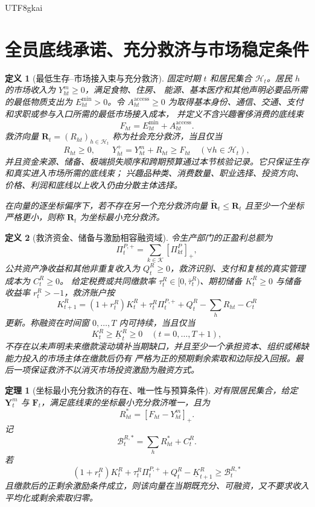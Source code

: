 \documentclass[12pt,a4paper,openany]{report}
\newtheorem{definition}{定义}[chapter]
\newtheorem{theorem}{定理}[chapter]
\begin{document}
\begin{CJK*}{UTF8}{gkai}
\section{全员底线承诺、充分救济与市场稳定条件}
\label{sec:sufficient-relief-floor}

\begin{definition}[最低生存--市场接入束与充分救济]
固定时期 \(t\) 和居民集合 \(\mathcal H_t\)。居民 \(h\) 的市场收入为 \(Y_{ht}^{m}\ge0\)，满足食物、住房、
能源、基本医疗和其他声明必要品所需的最低物质支出为 \(E_{ht}^{\min}>0\)。令
\(A_{ht}^{\mathrm{access}}\ge0\) 为取得基本身份、通信、交通、支付和求职或参与入口所需的最低市场接入成本，
并定义不含兴趣奢侈消费的底线束
\[
  F_{ht}
  =E_{ht}^{\min}+A_{ht}^{\mathrm{access}}.
\]
救济向量 \(\mathbf R_t=(R_{ht})_{h\in\mathcal H_t}\) 称为社会充分救济，当且仅当
\[
  R_{ht}\ge0,
  \qquad
  Y_{ht}^{+}=Y_{ht}^{m}+R_{ht}\ge F_{ht}
  \quad(\forall h\in\mathcal H_t),
\]
并且资金来源、储备、极端损失顺序和跨期预算通过本节核验记录。它只保证生存和真实进入市场所需的底线束；
兴趣品种类、消费数量、职业选择、投资方向、价格、利润和底线以上收入仍由分散主体选择。

在向量的逐坐标偏序下，若不存在另一个充分救济向量
\(\widetilde{\mathbf R}_t\le\mathbf R_t\) 且至少一个坐标严格更小，则称 \(\mathbf R_t\) 为坐标最小充分救济。
\end{definition}

\begin{definition}[救济资金、储备与激励相容融资域]
令生产部门的正盈利总额为
\[
  \Pi_t^{P,+}
  =\sum_{k\in\mathcal K}[\Pi_{kt}^{P}]_+,
\]
公共资产净收益和其他非重复收入为 \(Q_t^R\ge0\)，救济识别、支付和复核的真实管理成本为 \(C_t^R\ge0\)。
给定税费或共同缴款率 \(\tau_t^R\in[0,\bar\tau_t^R)\)、期初储备 \(K_t^R\ge0\) 与储备收益率
\(r_t^R>-1\)，救济账户按
\[
  K_{t+1}^{R}
  =(1+r_t^R)K_t^R
  +\tau_t^R\Pi_t^{P,+}+Q_t^R
  -\sum_hR_{ht}-C_t^R
\]
更新。称融资在时间窗 \(0,\ldots,T\) 内可持续，当且仅当
\[
  K_t^R\ge\underline K_t^R\ge0
  \quad(t=0,\ldots,T+1),
\]
不存在以未声明未来缴款滚动填补当期缺口，并且至少一个承担资本、组织或稀缺能力投入的市场主体在缴款后仍有
严格为正的预期剩余索取和边际投入回报。最后一项保证救济不以消灭市场投资激励为融资方式。
\end{definition}

\begin{theorem}[坐标最小充分救济的存在、唯一性与预算条件]
\label{thm:minimal-sufficient-relief}
对有限居民集合，给定 \(\mathbf Y_t^m\) 与 \(\mathbf F_t\)，满足底线束的坐标最小充分救济唯一，且为
\[
  R_{ht}^{*}
  =[F_{ht}-Y_{ht}^{m}]_+.
\]
记
\[
  \mathcal B_t^{R,*}
  =\sum_hR_{ht}^{*}+C_t^R.
\]
若
\[
  (1+r_t^R)K_t^R+\tau_t^R\Pi_t^{P,+}+Q_t^R
  -\underline K_{t+1}^R
  \ge\mathcal B_t^{R,*}
\]
且缴款后的正剩余激励条件成立，则该向量在当期既充分、可融资，又不要求收入平均化或剩余索取归零。
\end{theorem}


\end{CJK*}
\end{document}

